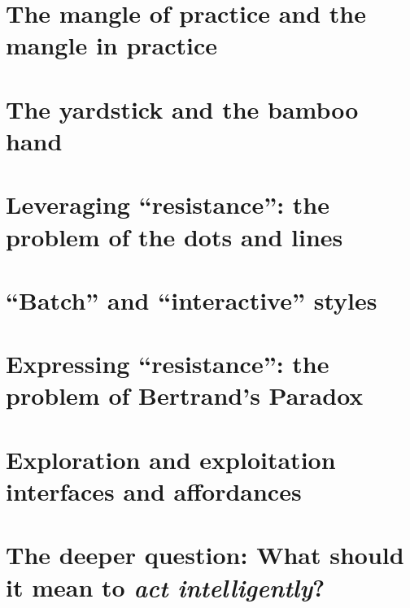 \section{The mangle of practice and the mangle in practice}\hypertarget{the-mangle-of-practice-and-the-mangle-in-practice}{}\label{the-mangle-of-practice-and-the-mangle-in-practice}

\section{The yardstick and the bamboo hand}\hypertarget{the-yardstick-and-the-bamboo-hand}{}\label{the-yardstick-and-the-bamboo-hand}

\section{Leveraging ``resistance'': the problem of the dots and lines}\hypertarget{leveraging-resistance-the-problem-of-the-dots-and-lines}{}\label{leveraging-resistance-the-problem-of-the-dots-and-lines}

\section{``Batch'' and ``interactive'' styles}\hypertarget{batch-and-interactive-styles}{}\label{batch-and-interactive-styles}

\section{Expressing ``resistance'': the problem of Bertrand's Paradox}\hypertarget{expressing-resistance-the-problem-of-bertrands-paradox}{}\label{expressing-resistance-the-problem-of-bertrands-paradox}

\section{Exploration and exploitation interfaces and affordances}\hypertarget{exploration-and-exploitation-interfaces-and-affordances}{}\label{exploration-and-exploitation-interfaces-and-affordances}

\section{The deeper question: What should it mean to \emph{act intelligently}?}\hypertarget{the-deeper-question-what-should-it-mean-to-act-intelligently}{}\label{the-deeper-question-what-should-it-mean-to-act-intelligently}

